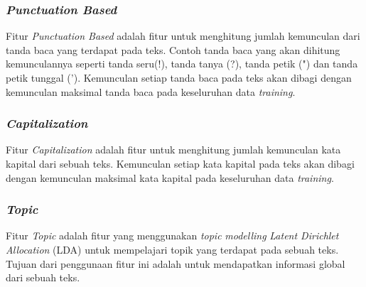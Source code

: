 \subsubsection{\textit{Punctuation Based}}
Fitur \textit{Punctuation Based }adalah fitur untuk menghitung jumlah 
kemunculan dari tanda baca yang terdapat pada teks. Contoh tanda baca 
yang akan dihitung kemunculannya seperti tanda seru(!), tanda tanya (?), 
tanda petik (") dan tanda petik tunggal ('). Kemunculan setiap tanda 
baca pada teks akan dibagi dengan kemunculan maksimal tanda baca pada 
keseluruhan data \textit{training}.
\subsubsection{\textit{Capitalization}}
Fitur \textit{Capitalization }adalah fitur untuk menghitung jumlah 
kemunculan kata kapital dari sebuah teks. Kemunculan setiap kata kapital 
pada teks akan dibagi dengan kemunculan maksimal kata kapital pada 
keseluruhan data \textit{training}.
\subsubsection{\textit{Topic}}
Fitur \textit{Topic }adalah fitur yang menggunakan \textit{topic} 
\textit{modelling} \textit{Latent Dirichlet Allocation }(LDA) untuk 
mempelajari topik yang terdapat pada sebuah teks. Tujuan dari penggunaan 
fitur ini adalah untuk mendapatkan informasi global\textit{ }dari 
sebuah teks.

\begin{adjustbox}{width=1\textwidth}
\centering
\begin{minipage}{\linewidth}
\end{minipage}
\end{adjustbox}

